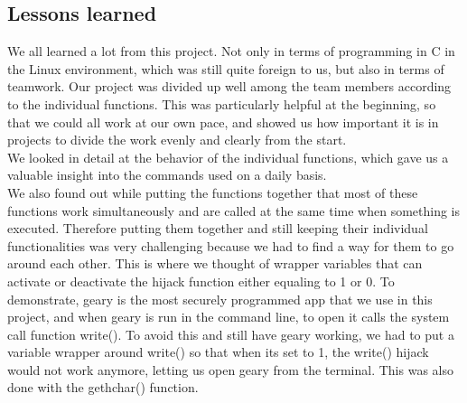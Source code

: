 \subsection{Lessons learned}
We all learned a lot from this project.
 Not only in terms of programming in C in the Linux environment, which was still quite foreign to us, but also in terms of teamwork. 
 Our project was divided up well among the team members according to the individual functions. This was particularly helpful at the beginning, so that we could all work at our own pace, and showed us how important it is in projects to divide the work evenly and clearly from the start. \\
 We looked in detail at the behavior of the individual functions, which gave us a valuable insight into the commands used on a daily basis. \\
 We also found out while putting the functions together that most of these functions work simultaneously and are called at the same time when something is executed. Therefore putting them together and still keeping their individual functionalities was very challenging because we had to find a way for them to go around each other. This is where we thought of wrapper variables that can activate or deactivate the hijack function either equaling to 1 or 0. To demonstrate, geary is the most securely programmed app that we use in this project, and when geary is run in the command line, to open it calls the system call function write(). To avoid this and still have geary working, we had to put a variable wrapper around write() so that when its set to 1, the write() hijack would not work anymore, letting us open geary from the terminal. This was also done with the gethchar() function.
